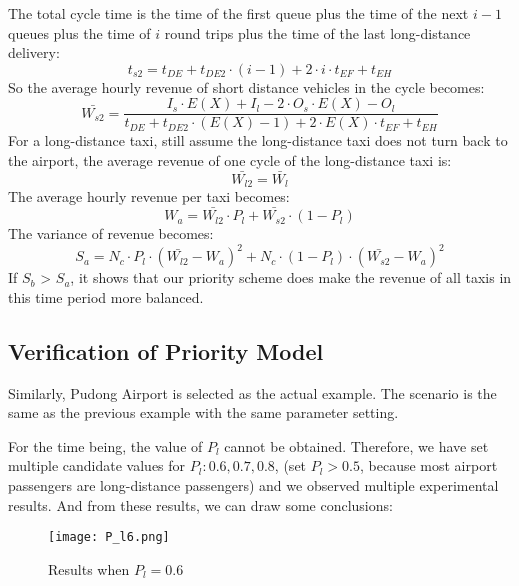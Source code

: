 The total cycle time is the time of the first queue plus the time of the next $i-1$ queues plus the time of $i$ round trips plus the time of the last long-distance delivery:
\begin{equation}
	t_{s2} = t_{DE}+t_{DE2}\cdot (i-1) + 2 \cdot i \cdot t_{EF} + t_{EH}
\label{t_s2}
\end{equation}
So the average hourly revenue of short distance vehicles in the cycle becomes:
\begin{equation}
	\bar{W_{s2}} = \frac{I_{s}\cdot E(X)+I_{l}-2\cdot O_{s}\cdot E(X)-O_{l}}{t_{DE} +t_{DE2}\cdot (E(X)-1)+2 \cdot E(X)\cdot t_{EF}+t_{EH}}
\label{W_s_2}
\end{equation}
For a long-distance taxi, still assume the long-distance taxi does not turn back to the airport, the average revenue of one cycle of the long-distance taxi is:
\begin{equation}
	\bar{W_{l2}} = \bar{W_{l}}
\label{W_l2_bar}
\end{equation}
The average hourly revenue per taxi becomes:
\begin{equation}
	W_{a} = \bar{W_{l2}}\cdot P_{l} + \bar{W_{s2}} \cdot (1 - P_{l})
\label{W_a}
\end{equation}
The variance of revenue becomes:
\begin{equation}
	S_{a} = N_{c}\cdot P_{l}\cdot (\bar{W_{l2}} - W_{a})^{2} + N_{c}\cdot(1- P_{l}) \cdot (\bar{W_{s2}} - W_{a})^{2}
\label{S_b}
\end{equation}
If $S_{b}$ > $S_{a}$, it shows that our priority scheme does make the revenue of all taxis in this time period more balanced.
\subsection{Verification of Priority Model}
Similarly, Pudong Airport is selected as the actual example. The scenario is the same as the previous example with the same parameter setting. 

For the time being, the value of $P_{l}$ cannot be obtained. Therefore, we have set multiple candidate values for $P_{l}: 0.6, 0.7, 0.8$, (set $P_{l} > 0.5$, because most airport passengers are long-distance passengers) and we observed multiple experimental results. And from these results, we can draw some conclusions:
\begin{figure}[h]
\centering
\texttt{[image: P\_l6.png]}
\caption{Results when $P_{l} = 0.6$}
\label{P_l6}
\end{figure}

